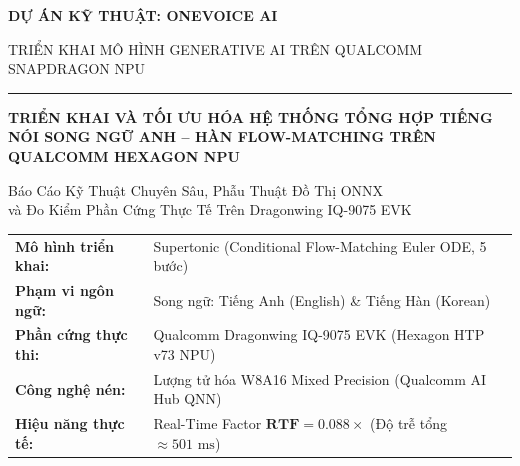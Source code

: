 \documentclass[11pt,a4paper,oneside,table]{report}
\begin{document}
\begin{titlepage}

    \centering
    \vspace*{0.8cm}
    
    {\Large\bfseries\sffamily DỰ ÁN KỸ THUẬT: ONEVOICE AI\par}
    \vspace{0.3cm}
    {\small\sffamily TRIỂN KHAI MÔ HÌNH GENERATIVE AI TRÊN QUALCOMM SNAPDRAGON NPU\par}
    \vspace{0.2cm}
    \noindent\rule{0.6\linewidth}{1pt}\par
    \vspace{1.5cm}

    {\huge\bfseries\sffamily\color{primaryblue} 
    TRIỂN KHAI VÀ TỐI ƯU HÓA HỆ THỐNG TỔNG HỢP TIẾNG NÓI SONG NGỮ ANH -- HÀN FLOW-MATCHING TRÊN QUALCOMM HEXAGON NPU\par}
    
    \vspace{0.8cm}
    {\large\sffamily\color{darkslate} 
    Báo Cáo Kỹ Thuật Chuyên Sâu, Phẫu Thuật Đồ Thị ONNX \\ 
    và Đo Kiểm Phần Cứng Thực Tế Trên Dragonwing IQ-9075 EVK\par}

    \vfill

    \begin{tcolorbox}[colback=white,colframe=primaryblue!80,arc=2mm,width=0.88\linewidth]
        \small\sffamily
        \begin{tabular}{ll}
            \textbf{Mô hình triển khai:}  & Supertonic (Conditional Flow-Matching Euler ODE, 5 bước) \\
            \textbf{Phạm vi ngôn ngữ:}    & Song ngữ: Tiếng Anh (English) \& Tiếng Hàn (Korean) \\
            \textbf{Phần cứng thực thi:}  & Qualcomm Dragonwing IQ-9075 EVK (Hexagon HTP v73 NPU) \\
            \textbf{Công nghệ nén:}       & Lượng tử hóa W8A16 Mixed Precision (Qualcomm AI Hub QNN) \\
            \textbf{Hiệu năng thực tế:}   & Real-Time Factor $\mathbf{RTF = 0.088\times}$ (Độ trễ tổng $\approx 501\text{ ms}$)
        \end{tabular}
    \end{tcolorbox}


\end{titlepage}
\end{document}
